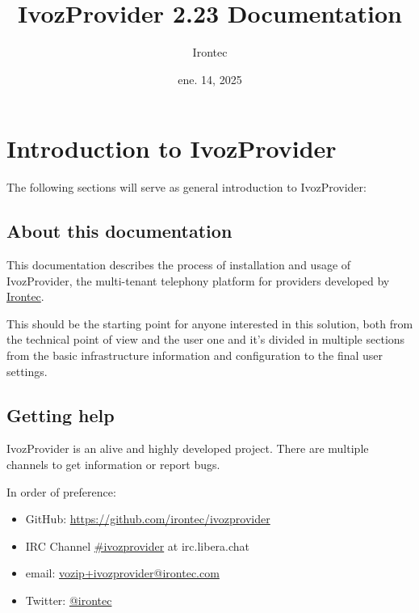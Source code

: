 \documentclass[letterpaper,10pt,spanish]{sphinxmanual}
\title{IvozProvider 2.23 Documentation}
\date{ene. 14, 2025}
\author{Irontec}
\begin{document}
\maketitle
\tableofcontents
{}\label{index::doc}



\chapter{Introduction to IvozProvider}
\label{basic_concepts/intro/index::doc}\label{basic_concepts/intro/index:introduction-to-ivozprovider}\label{basic_concepts/intro/index:ivozprovider-official-documentation}
The following sections will serve as general introduction to IvozProvider:


\section{About this documentation}
\label{basic_concepts/intro/about::doc}\label{basic_concepts/intro/about:about-this-documentation}
This documentation describes the process of installation and usage of
IvozProvider, the multi-tenant telephony platform for providers developed
by \href{http://irontec.com}{Irontec}.

This should be the starting point for anyone interested in this solution,
both from the technical point of view and the user one and it's divided
in multiple sections from the basic infrastructure information and configuration
to the final user settings.


\section{Getting help}
\label{basic_concepts/intro/getting_help:getting-help}\label{basic_concepts/intro/getting_help::doc}\label{basic_concepts/intro/getting_help:id1}
IvozProvider is an alive and highly developed project. There are
multiple channels to get information or report bugs.

In order of preference:
\begin{itemize}
\item {} 
GitHub: \url{https://github.com/irontec/ivozprovider}

\item {} 
IRC Channel \href{https://kiwiirc.com/nextclient/irc.libera.chat/\#ivozprovider}{\#ivozprovider} at irc.libera.chat

\item {} 
email: \href{mailto:vozip+ivozprovider@irontec.com}{vozip+ivozprovider@irontec.com}

\item {} 
Twitter: \href{https://twitter.com/irontec}{@irontec}

\end{itemize}
\end{document}
